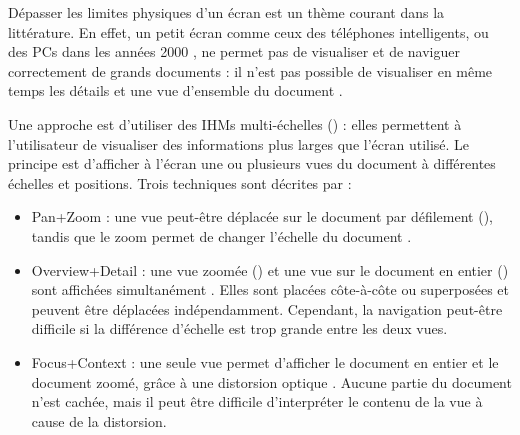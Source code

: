 Dépasser les limites physiques d'un écran est un thème courant dans la littérature. En effet, un petit écran comme ceux des téléphones intelligents, ou des PCs dans les années 2000 \citep{Baudisch2002}, ne permet pas de visualiser et de naviguer correctement de grands documents : il n'est pas possible de visualiser en même temps les détails et une vue d'ensemble du document .


Une approche est d'utiliser des IHMs multi-échelles () : elles permettent à l'utilisateur de visualiser des informations plus larges que l'écran utilisé. Le principe est d'afficher à l'écran une ou plusieurs vues du document à différentes échelles et positions. Trois techniques sont décrites par \cite{Guiard2004} :
\begin{itemize}
  \item Pan+Zoom : une vue peut-être déplacée sur le document par défilement (), tandis que le zoom permet de changer l'échelle du document .
  \item Overview+Detail : une vue zoomée () et une vue sur le document en entier () sont affichées simultanément . Elles sont placées côte-à-côte ou superposées et peuvent être déplacées indépendamment. Cependant, la navigation peut-être difficile si la différence d'échelle est trop grande entre les deux vues.
  \item Focus+Context : une seule vue permet d'afficher le document en entier et le document zoomé, grâce à une distorsion optique . Aucune partie du document n'est cachée, mais il peut être difficile d'interpréter le contenu de la vue à cause de la distorsion.
\end{itemize}
\medskip


